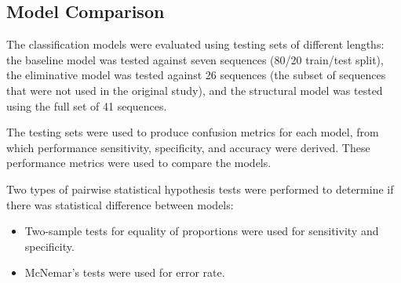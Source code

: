 \subsection{Model Comparison}

The classification models were evaluated using testing sets of different lengths: the baseline model was tested against seven sequences (80/20 train/test split), the eliminative model was tested against 26 sequences (the subset of sequences that were not used in the original study), and the structural model was tested using the full set of 41 sequences.

The testing sets were used to produce confusion metrics for each model, from which performance sensitivity, specificity, and accuracy were derived. These performance metrics were used to compare the models.

Two types of pairwise statistical hypothesis tests were performed to determine if there was statistical difference between models:
\begin{itemize}
    \setlength\itemsep{0em}
    \item Two-sample tests for equality of proportions were used for sensitivity and specificity.
    \item McNemar's tests were used for error rate.
\end{itemize}
